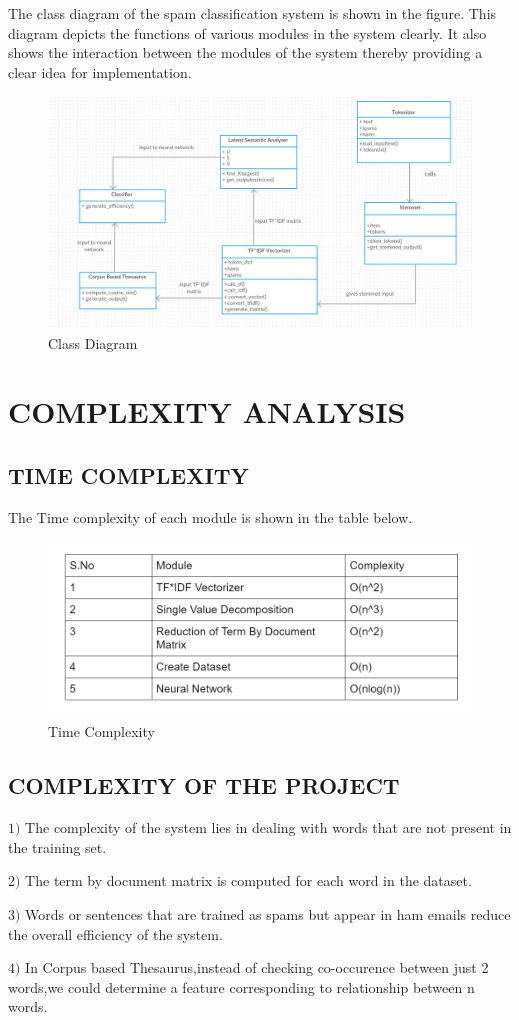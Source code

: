 The class diagram of the spam classification system is shown in the figure. This diagram depicts the functions of various modules in the system clearly. It also shows the interaction between the modules of the system thereby providing a clear idea for implementation.

\begin{figure}[h]
\centering\includegraphics[width=1.0\linewidth]{class.png}
\caption{Class Diagram}
\end{figure}

\section{COMPLEXITY ANALYSIS}
\subsection{TIME COMPLEXITY}
The Time complexity of each module is shown in the table below.

\begin{figure}[h]
\centering\includegraphics[width=1.0\linewidth]{complex.PNG}
\caption{Time Complexity}
\end{figure}

\subsection{COMPLEXITY OF THE PROJECT}
$1)$ The complexity of the system lies in dealing with words that are not present in the training set.


$2)$ The term by document matrix is computed for each word in the dataset.


$3)$ Words or sentences that are trained as spams but appear in ham emails reduce the overall efficiency of the system.


$4)$ In Corpus based Thesaurus,instead of checking co-occurence between just 2 words,we could determine a feature corresponding to relationship between n words.	